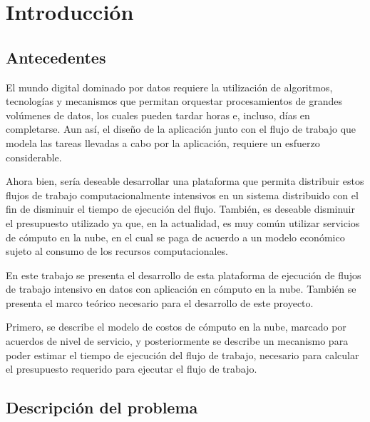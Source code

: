 \chapter{Introducción}
\label{chap:intro}

\section{Antecedentes}

El mundo digital dominado por datos requiere la utilización de algoritmos, tecnologías y mecanismos que permitan orquestar procesamientos de grandes volúmenes de datos, los cuales pueden tardar horas e, incluso, días en completarse. Aun así, el diseño de la aplicación junto con el flujo de trabajo que modela las tareas llevadas a cabo por la aplicación, requiere un esfuerzo considerable.

Ahora bien, sería deseable desarrollar una plataforma que permita distribuir estos flujos de trabajo computacionalmente intensivos en un sistema distribuido con el fin de disminuir el tiempo de ejecución del flujo. También, es deseable disminuir el presupuesto utilizado ya que, en la actualidad, es muy común utilizar servicios de cómputo en la nube, en el cual se paga de acuerdo a un modelo económico sujeto al consumo de los recursos computacionales.

En este trabajo se presenta el desarrollo de esta plataforma de ejecución de flujos de trabajo intensivo en datos con aplicación en cómputo en la nube. También se presenta el marco teórico necesario para el desarrollo de este proyecto.

Primero, se describe el modelo de costos de cómputo en la nube, marcado por acuerdos de nivel de servicio, y posteriormente se describe un mecanismo para poder estimar el tiempo de ejecución del flujo de trabajo, necesario para calcular el presupuesto requerido para ejecutar el flujo de trabajo. 



\section{Descripción del problema}

